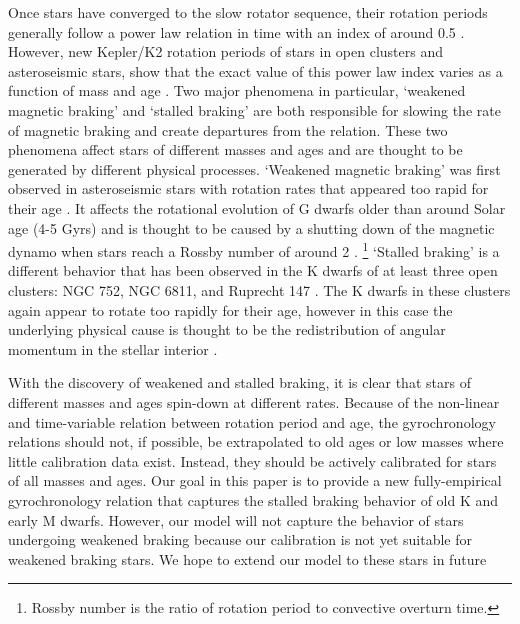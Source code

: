 Once stars have converged to the slow rotator sequence, their rotation periods
generally follow a power law relation in time with an index of around 0.5
\citep{skumanich1972}.
However, new Kepler/K2 rotation periods of stars in open clusters and
asteroseismic stars, show that the exact value of this power law index varies
as a function of mass and age \citep{angus2015, vansaders2016, curtis2019,
spada2019}.
Two major phenomena in particular, `weakened magnetic braking' and `stalled
braking' are both responsible for slowing the rate of magnetic
braking and create departures from the \citet{skumanich1972} relation.
These two phenomena affect stars of different masses and ages and are thought
to be generated by different physical processes.
`Weakened magnetic braking' was first observed in asteroseismic stars with
rotation rates that appeared too rapid for their age
\citep{angus2015}.
It affects the rotational evolution of G dwarfs older
than around Solar age (4-5 Gyrs) and is thought to be caused by a shutting down
of the magnetic dynamo when stars reach a Rossby number of around 2
\citep{vansaders2016, vansaders2018}.
\footnote{Rossby number is the ratio of rotation period to convective overturn
time.}
`Stalled braking' is a different behavior that has been observed in
the K dwarfs of at least three open clusters: NGC 752, NGC 6811, and Ruprecht
147 \citep{agueros, curtis2019, curtis2020}.
The K dwarfs in these clusters again appear to rotate too rapidly for their
age, however in this case the underlying physical cause is thought to be the
redistribution of angular momentum in the stellar interior \citep{spada2019}.

With the discovery of weakened and stalled braking, it is clear that stars of
different masses and ages spin-down at different rates.
Because of the non-linear and time-variable relation between rotation period
and age, the gyrochronology relations should not, if possible, be extrapolated
to old ages or low masses where little calibration data exist.
Instead, they should be actively calibrated for stars of all masses and ages.
Our goal in this paper is to provide a new fully-empirical gyrochronology
relation that captures the stalled braking behavior of old K and early M
dwarfs.
However, our model will not capture the behavior of stars undergoing weakened
braking because our calibration is not yet suitable for weakened braking
stars.
We hope to extend our model to these stars in future



